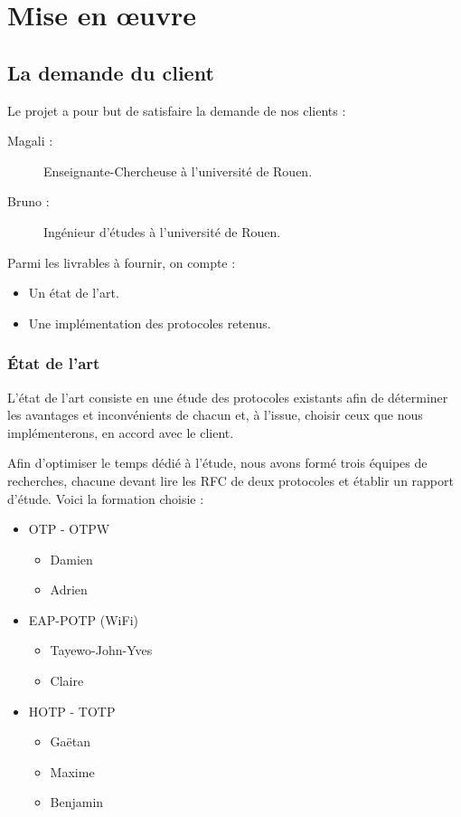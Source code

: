 \chapter{Mise en œuvre}
\section{La demande du client}

  Le projet a pour but de satisfaire la demande de nos clients :

  \begin{description}
    \item[Magali :] Enseignante-Chercheuse à l'université de Rouen.
    \item[Bruno :] Ingénieur d'études à l'université de Rouen.\\
  \end{description}

  Parmi les livrables à fournir, on compte :

  \begin{itemize}
    \item Un état de l'art.
    \item Une implémentation des protocoles retenus.
  \end{itemize}

  \subsection{État de l'art}

    L'état de l'art consiste en une étude des protocoles existants afin de
    déterminer les avantages et inconvénients de chacun et, à l'issue, choisir
    ceux que nous implémenterons, en accord avec le client.

    Afin d'optimiser le temps dédié à l'étude, nous avons formé trois équipes
    de recherches, chacune devant lire les RFC de deux protocoles et établir
    un rapport d'étude. Voici la formation choisie :

    \begin{itemize}
        \item OTP - OTPW
      \begin{itemize}
        \item Damien 
        \item Adrien 
      \end{itemize}
      \item EAP-POTP (WiFi)
      \begin{itemize}
        \item Tayewo-John-Yves 
        \item Claire 
      \end{itemize}
      \item HOTP - TOTP
      \begin{itemize}
        \item Gaëtan 
        \item Maxime 
        \item Benjamin 
      \end{itemize}
    \end{itemize}

